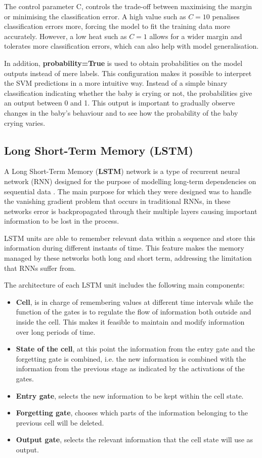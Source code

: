 The control parameter C, controls the trade-off between maximising the margin or minimising the classification error. A high value such as \( C = 10 \) penalises classification errors more, forcing the model to fit the training data more accurately. However, a low heat such as \( C = 1 \) allows for a wider margin and tolerates more classification errors, which can also help with model generalisation. 

In addition, \textbf{probability=True} is used to obtain probabilities on the model outputs instead of mere labels. This configuration makes it possible to interpret the SVM predictions in a more intuitive way. Instead of a simple binary classification indicating whether the baby is crying or not, the probabilities give an output between 0 and 1. This output is important to gradually observe changes in the baby's behaviour and to see how the probability of the baby crying varies.


\subsection{Long Short-Term Memory (LSTM)}
A Long Short-Term Memory (\textbf{LSTM}) network is a type of recurrent neural network (RNN) designed for the purpose of modelling long-term dependencies on sequential data \cite{Sak2014}. The main purpose for which they were designed was to handle the vanishing gradient problem that occurs in traditional RNNs, in these networks error is backpropagated through their multiple layers causing important information to be lost in the process. 

LSTM units are able to remember relevant data within a sequence and store this information during different instants of time. This feature makes the memory managed by these networks both long and short term, addressing the limitation that RNNs suffer from. 

The architecture of each LSTM unit includes the following main components:
\begin{itemize}
    \item \textbf{Cell}, is in charge of remembering values at different time intervals while the function of the gates is to regulate the flow of information both outside and inside the cell. This makes it feasible to maintain and modify information over long periods of time. 
    \item \textbf{State of the cell}, at this point the information from the entry gate and the forgetting gate is combined, i.e. the new information is combined with the information from the previous stage as indicated by the activations of the gates. 
    \item \textbf{Entry gate}, selects the new information to be kept within the cell state. 
    \item \textbf{Forgetting gate}, chooses which parts of the information belonging to the previous cell will be deleted. 
    \item \textbf{Output gate}, selects the relevant information that the cell state will use as output.  
\end{itemize}


